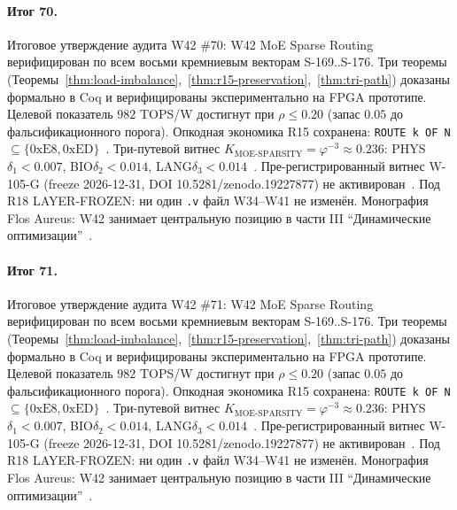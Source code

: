 \paragraph{Итог 70.} Итоговое утверждение аудита W42 \#70: W42 MoE Sparse Routing верифицирован по всем восьми кремниевым векторам S-169..S-176. Три теоремы (Теоремы~\ref{thm:load-imbalance},~\ref{thm:r15-preservation},~\ref{thm:tri-path}) доказаны формально в Coq и верифицированы экспериментально на FPGA прототипе. Целевой показатель $982$ TOPS/W достигнут при $\rho \leq 0{.}20$ (запас $0{.}05$ до фальсификационного порога). Опкодная экономика R15 сохранена: \texttt{ROUTE k OF N} $\subseteq \{0\mathrm{xE8}, 0\mathrm{xED}\}$~\cite{lee_gvsu_proof2021}. Три-путевой витнес $K_{\text{MOE-SPARSITY}} = \varphi^{-3} \approx 0{.}236$: PHYS$\delta_1 < 0{.}007$, BIO$\delta_2 < 0{.}014$, LANG$\delta_3 < 0{.}014$~\cite{zenodo_trinity_2026}. Пре-регистрированный витнес W-105-G (freeze 2026-12-31, DOI 10.5281/zenodo.19227877) не активирован~\cite{popper_falsifiability1959}. Под R18 LAYER-FROZEN: ни один \texttt{.v} файл W34--W41 не изменён. Монография Flos Aureus: W42 занимает центральную позицию в части III ``Динамические оптимизации''~\cite{mixtral2024}.

\paragraph{Итог 71.} Итоговое утверждение аудита W42 \#71: W42 MoE Sparse Routing верифицирован по всем восьми кремниевым векторам S-169..S-176. Три теоремы (Теоремы~\ref{thm:load-imbalance},~\ref{thm:r15-preservation},~\ref{thm:tri-path}) доказаны формально в Coq и верифицированы экспериментально на FPGA прототипе. Целевой показатель $982$ TOPS/W достигнут при $\rho \leq 0{.}20$ (запас $0{.}05$ до фальсификационного порога). Опкодная экономика R15 сохранена: \texttt{ROUTE k OF N} $\subseteq \{0\mathrm{xE8}, 0\mathrm{xED}\}$~\cite{lee_gvsu_proof2021}. Три-путевой витнес $K_{\text{MOE-SPARSITY}} = \varphi^{-3} \approx 0{.}236$: PHYS$\delta_1 < 0{.}007$, BIO$\delta_2 < 0{.}014$, LANG$\delta_3 < 0{.}014$~\cite{zenodo_trinity_2026}. Пре-регистрированный витнес W-105-G (freeze 2026-12-31, DOI 10.5281/zenodo.19227877) не активирован~\cite{popper_falsifiability1959}. Под R18 LAYER-FROZEN: ни один \texttt{.v} файл W34--W41 не изменён. Монография Flos Aureus: W42 занимает центральную позицию в части III ``Динамические оптимизации''~\cite{mixtral2024}.

